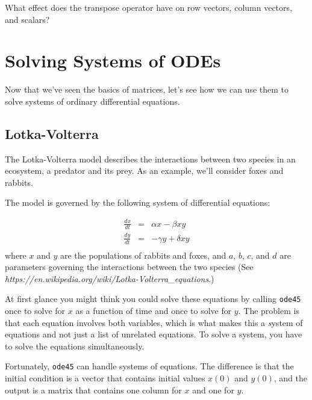 \begin{ex}
What effect does the transpose operator
have on row vectors, column vectors, and scalars?
\end{ex}

\section{Solving Systems of ODEs}
Now that we've seen the basics of matrices, let's see how we can use them to solve systems of ordinary differential equations.
\subsection{Lotka-Volterra}
\label{lotka}
The Lotka-Volterra model describes the interactions between two
species in an ecosystem, a predator and its prey.  As an example, we'll consider foxes and rabbits.


The model is governed by the following system of differential equations:

\begin{eqnarray}
    \frac{dx}{dt} &=& \alpha x - \beta x y         \\
    \frac{dy}{dt} &=& -\gamma y + \delta x y       \\
\end{eqnarray}
%
where $x$ and $y$ are the populations of rabbits and foxes,
and $a$, $b$, $c$, and $d$ are parameters
governing the interactions between the two species (See
\emph{https://en.wikipedia.org/wiki/Lotka-Volterra\_equations}.)

At first glance you might think you could solve these equations by
calling {\tt ode45} once to solve for $x$ as a function of time and
once to solve for $y$.  The problem is that each equation involves
both variables, which is what makes this a {\emph system of equations}
and not just a list of unrelated equations.  To solve a system, you
have to solve the equations simultaneously.


Fortunately, {\tt ode45} can handle systems of equations.  The
difference is that the initial condition is a vector that contains
initial values $x(0)$ and $y(0)$, and the output is a matrix
that contains one column for $x$ and one for $y$.


